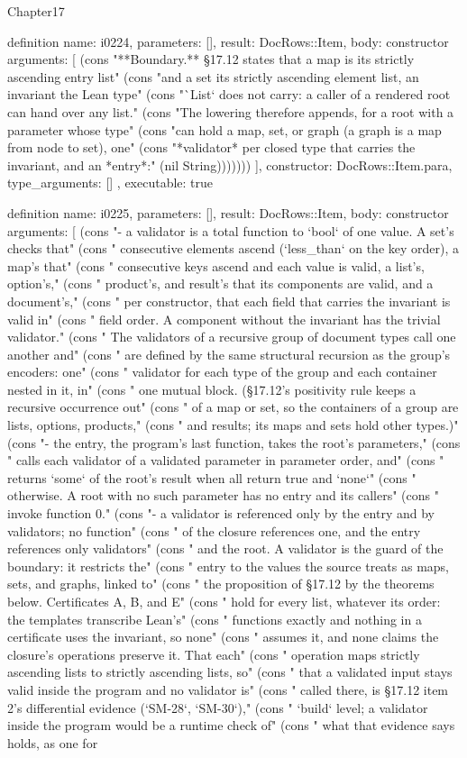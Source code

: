 \begin{lexlean}{Chapter17}
\begin{semanticmodule}
definition{
  name: i0224,
  parameters: [],
  result: DocRows::Item,
  body: constructor{
    arguments: [
      (cons "**Boundary.** §17.12 states that a map is its strictly ascending entry list" (cons "and a set its strictly ascending element list, an invariant the Lean type" (cons "`List` does not carry: a caller of a rendered root can hand over any list." (cons "The lowering therefore appends, for a root with a parameter whose type" (cons "can hold a map, set, or graph (a graph is a map from node to set), one" (cons "*validator* per closed type that carries the invariant, and an *entry*:" (nil String)))))))
    ],
    constructor: DocRows::Item.para,
    type_arguments: []
  },
  executable: true
}

definition{
  name: i0225,
  parameters: [],
  result: DocRows::Item,
  body: constructor{
    arguments: [
      (cons "- a validator is a total function to `bool` of one value. A set's checks that" (cons "  consecutive elements ascend (`less_than` on the key order), a map's that" (cons "  consecutive keys ascend and each value is valid, a list's, option's," (cons "  product's, and result's that its components are valid, and a document's," (cons "  per constructor, that each field that carries the invariant is valid in" (cons "  field order. A component without the invariant has the trivial validator." (cons "  The validators of a recursive group of document types call one another and" (cons "  are defined by the same structural recursion as the group's encoders: one" (cons "  validator for each type of the group and each container nested in it, in" (cons "  one mutual block. (§17.12's positivity rule keeps a recursive occurrence out" (cons "  of a map or set, so the containers of a group are lists, options, products," (cons "  and results; its maps and sets hold other types.)" (cons "- the entry, the program's last function, takes the root's parameters," (cons "  calls each validator of a validated parameter in parameter order, and" (cons "  returns `some` of the root's result when all return true and `none`" (cons "  otherwise. A root with no such parameter has no entry and its callers" (cons "  invoke function 0." (cons "- a validator is referenced only by the entry and by validators; no function" (cons "  of the closure references one, and the entry references only validators" (cons "  and the root. A validator is the guard of the boundary: it restricts the" (cons "  entry to the values the source treats as maps, sets, and graphs, linked to" (cons "  the proposition of §17.12 by the theorems below. Certificates A, B, and E" (cons "  hold for every list, whatever its order: the templates transcribe Lean's" (cons "  functions exactly and nothing in a certificate uses the invariant, so none" (cons "  assumes it, and none claims the closure's operations preserve it. That each" (cons "  operation maps strictly ascending lists to strictly ascending lists, so" (cons "  that a validated input stays valid inside the program and no validator is" (cons "  called there, is §17.12 item 2's differential evidence (`SM-28`, `SM-30`)," (cons "  `build` level; a validator inside the program would be a runtime check of" (cons "  what that evidence says holds, as one for }}
\end{semanticmodule}
\end{lexlean}
